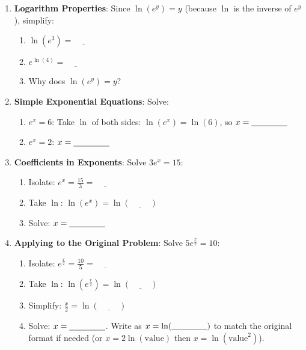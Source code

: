 \documentclass[12pt]{article}
\begin{document}
\begin{enumerate}[label=7.\arabic*]
    \item \textbf{Logarithm Properties}: Since \(\ln(e^y) = y\) (because \(\ln\) is the inverse of \(e^y\)), simplify:
    \begin{enumerate}[label=\alph*)]
        \item \( \ln(e^3) = \underline{\hspace{1cm}} \)
        \item \( e^{\ln(4)} = \underline{\hspace{1cm}} \)
        \item Why does \(\ln(e^y) = y\)? \underline{\hspace{6cm}}
    \end{enumerate}
    \item \textbf{Simple Exponential Equations}: Solve:
    \begin{enumerate}[label=\alph*)]
        \item \( e^x = 6 \): Take \(\ln\) of both sides: \( \ln(e^x) = \ln(6) \), so \( x = \underline{\hspace{1.5cm}} \)
        \item \( e^x = 2 \): \( x = \underline{\hspace{1.5cm}} \)
    \end{enumerate}
    \item \textbf{Coefficients in Exponents}: Solve \( 3e^x = 15 \):
    \begin{enumerate}[label=\alph*)]
        \item Isolate: \( e^x = \frac{15}{3} = \underline{\hspace{1cm}} \)
        \item Take \(\ln\): \( \ln(e^x) = \ln(\underline{\hspace{1cm}}) \)
        \item Solve: \( x = \underline{\hspace{1.5cm}} \)
    \end{enumerate}
    \item \textbf{Applying to the Original Problem}: Solve \( 5e^{\frac{x}{2}} = 10 \):
    \begin{enumerate}[label=\alph*)]
        \item Isolate: \( e^{\frac{x}{2}} = \frac{10}{5} = \underline{\hspace{1cm}} \)
        \item Take \(\ln\): \( \ln\left(e^{\frac{x}{2}}\right) = \ln(\underline{\hspace{1cm}}) \)
        \item Simplify: \( \frac{x}{2} = \ln(\underline{\hspace{1cm}}) \)
        \item Solve: \( x = \underline{\hspace{1.5cm}} \). Write as \( x = \ln(\underline{\hspace{1.5cm}}) \) to match the original format if needed (or \(x=2\ln(\text{value})\) then \(x=\ln(\text{value}^2)\)).
    \end{enumerate}
\end{enumerate}
\end{document}
